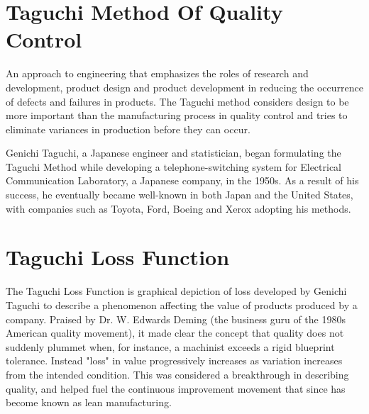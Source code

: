 \documentclass[12pts]{article}
\begin{document}
\tableofcontents


\section{Taguchi Method Of Quality Control}


An approach to engineering that emphasizes the roles of research and development, product design and product development in reducing the occurrence of defects and failures in products. The Taguchi method considers design to be more important than the manufacturing process in quality control and tries to eliminate variances in production before they can occur.

Genichi Taguchi, a Japanese engineer and statistician, began formulating the Taguchi Method while developing a telephone-switching system for Electrical Communication Laboratory, a Japanese company, in the 1950s. As a result of his success, he eventually became well-known in both Japan and the United States, with companies such as Toyota, Ford, Boeing and Xerox adopting his methods.

\section{Taguchi Loss Function}
The Taguchi Loss Function is graphical depiction of loss developed by Genichi Taguchi to describe a phenomenon affecting the value of products produced by a company. Praised by Dr. W. Edwards Deming (the business guru of the 1980s American quality movement), it made clear the concept that quality does not suddenly plummet when, for instance, a machinist exceeds a rigid blueprint tolerance. Instead "loss" in value progressively increases as variation increases from the intended condition. This was considered a breakthrough in describing quality, and helped fuel the continuous improvement movement that since has become known as lean manufacturing.
\end{document}
